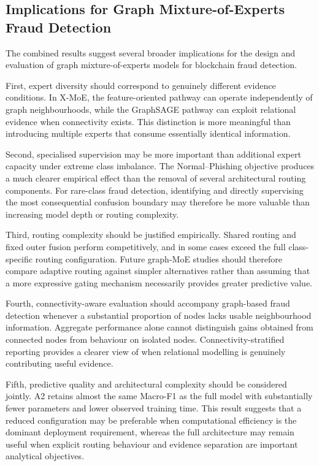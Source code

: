 \documentclass{ieeeaccess}
\begin{document}
\subsection{Implications for Graph Mixture-of-Experts Fraud Detection}

The combined results suggest several broader implications for the design and evaluation of graph mixture-of-experts models for blockchain fraud detection.

First, expert diversity should correspond to genuinely different evidence conditions. In X-MoE, the feature-oriented pathway can operate independently of graph neighbourhoods, while the GraphSAGE pathway can exploit relational evidence when connectivity exists. This distinction is more meaningful than introducing multiple experts that consume essentially identical information.

Second, specialised supervision may be more important than additional expert capacity under extreme class imbalance. The Normal--Phishing objective produces a much clearer empirical effect than the removal of several architectural routing components. For rare-class fraud detection, identifying and directly supervising the most consequential confusion boundary may therefore be more valuable than increasing model depth or routing complexity.

Third, routing complexity should be justified empirically. Shared routing and fixed outer fusion perform competitively, and in some cases exceed the full class-specific routing configuration. Future graph-MoE studies should therefore compare adaptive routing against simpler alternatives rather than assuming that a more expressive gating mechanism necessarily provides greater predictive value.

Fourth, connectivity-aware evaluation should accompany graph-based fraud detection whenever a substantial proportion of nodes lacks usable neighbourhood information. Aggregate performance alone cannot distinguish gains obtained from connected nodes from behaviour on isolated nodes. Connectivity-stratified reporting provides a clearer view of when relational modelling is genuinely contributing useful evidence.

Fifth, predictive quality and architectural complexity should be considered jointly. A2 retains almost the same Macro-F1 as the full model with substantially fewer parameters and lower observed training time. This result suggests that a reduced configuration may be preferable when computational efficiency is the dominant deployment requirement, whereas the full architecture may remain useful when explicit routing behaviour and evidence separation are important analytical objectives.
\end{document}
